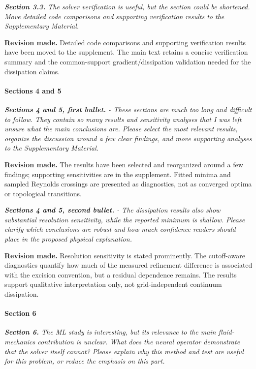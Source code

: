 \documentclass[11pt,a4paper]{article}
\newcommand{\qcomment}[1]{\textcolor{deepblue}{\itshape #1}}
\newcommand{\revwork}[1]{\textbf{\textcolor{revgreen}{#1}}}
\begin{document}
\medskip
\noindent\qcomment{\textbf{Section 3.3.} The solver verification is useful, but the section could be shortened. Move detailed code comparisons and supporting verification results to the Supplementary Material.}

\noindent\revwork{Revision made.} Detailed code comparisons and supporting verification results have been moved to the supplement. The main text retains a concise verification summary and the common-support gradient/dissipation validation needed for the dissipation claims.

\medskip
\paragraph{Sections 4 and 5}

\medskip
\noindent\qcomment{\textbf{Sections 4 and 5, first bullet.} - These sections are much too long and difficult to follow. They contain so many results and sensitivity analyses that I was left unsure what the main conclusions are. Please select the most relevant results, organize the discussion around a few clear findings, and move supporting analyses to the Supplementary Material.}

\noindent\revwork{Revision made.} The results have been selected and reorganized around a few findings; supporting sensitivities are in the supplement. Fitted minima and sampled Reynolds crossings are presented as diagnostics, not as converged optima or topological transitions.

\medskip
\noindent\qcomment{\textbf{Sections 4 and 5, second bullet.} - The dissipation results also show substantial resolution sensitivity, while the reported minimum is shallow. Please clarify which conclusions are robust and how much confidence readers should place in the proposed physical explanation.}

\noindent\revwork{Revision made.} Resolution sensitivity is stated prominently. The cutoff-aware diagnostics quantify how much of the measured refinement difference is associated with the excision convention, but a residual dependence remains. The results support qualitative interpretation only, not grid-independent continuum dissipation.

\medskip
\paragraph{Section 6}

\medskip
\noindent\qcomment{\textbf{Section 6.} The ML study is interesting, but its relevance to the main fluid-mechanics contribution is unclear. What does the neural operator demonstrate that the solver itself cannot? Please explain why this method and test are useful for this problem, or reduce the emphasis on this part.}
\end{document}
